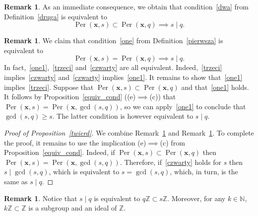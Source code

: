 \documentclass[leqno,a4paper,12pt]{article}
\theoremstyle{definition}
\newtheorem{Remark}[Th]{Remark}
\newcommand{\divides}{\mid}
\newcommand{\Per}{\operatorname{Per}\nolimits}
\newcommand{\Z}{{\mathbb{Z}}}
\newcommand{\N}{{\mathbb{N}}}
\begin{document}
\begin{Remark}\label{R1}
As an immediate consequence, we obtain that condition~\eqref{dwa} from Definition~\ref{druga} is equivalent to
\begin{equation}\label{trzeci}
\Per(\bm{x},s)\subset \Per(\bm{x},q) \implies s\divides q.
\end{equation}
\end{Remark}
\begin{Remark}\label{R2}
We claim that condition~\eqref{one} from Definition~\ref{pierwsza} is equivalent to
\begin{equation}\label{czwarty}
\Per(\bm{x},s)= \Per(\bm{x},q) \implies s\divides q.
\end{equation}
In fact,~\eqref{one1},~\eqref{trzeci} and~\eqref{czwarty} are all equivalent. Indeed,~\eqref{trzeci} implies~\eqref{czwarty} and~\eqref{czwarty} implies~\eqref{one1}. It remains to show that~\eqref{one1} implies~\eqref{trzeci}. Suppose that $\Per(\bm{x},s)\subset \Per(\bm{x},q)$ and that~\eqref{one1} holds. It follows by Proposition~\ref{equiv_cond} ((e)$\implies$(c)) that $\Per(\bm{x},s)=\Per(\bm{x},\gcd(s,q))$, so we can apply~\eqref{one1} to conclude that $\gcd(s,q)\geq s$. The latter condition is however equivalent to $s\divides q$.
\end{Remark}

\begin{proof}[Proof of Proposition~\ref{twierd}]
We combine Remark~\ref{R1} and Remark~\ref{R2}. To complete the proof, it remains to use the implication (e)$\implies$(c) from Proposition~\ref{equiv_cond}. Indeed, if $\Per(\bm{x},s)\subset \Per(\bm{x},q)$ then $\Per(\bm{x},s)=\Per(\bm{x},\gcd(s,q))$. Therefore, if~\eqref{czwarty} holds for $s$ then $s\divides\gcd(s,q)$, which is equivalent to $s=\gcd(s,q)$, which, in turn, is the same as $s\divides q$.
\end{proof}
\begin{Remark}\label{NOWA}
Notice that $s\divides q$ is equivalent to $q\Z\subset s\Z$. Moreover, for any $k\in\N$, $k\Z\subset \Z$ is a subgroup and an ideal of $\Z$.
\end{Remark}
\end{document}
